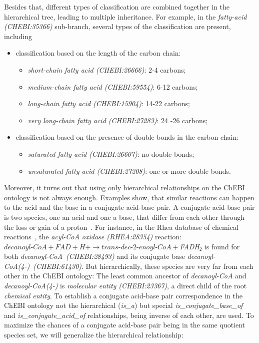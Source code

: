 \documentclass[10pt]{bmc_article}
\newenvironment{bmcformat}{\baselineskip20pt\sloppy\setboolean{publ}{false}}{\baselineskip20pt\sloppy}
\begin{document}
\begin{bmcformat}
Besides that, different types of classification are combined together in the hierarchical tree, leading to multiple inheritance. For example, in the \textit{fatty-acid (CHEBI:35366)} sub-branch, several types of the classification are present, including
\begin{itemize}
\item classification based on the length of the carbon chain:
\begin{itemize}
\item \textit{short-chain fatty acid (CHEBI:26666)}: 2-4 carbons;
\item \textit{medium-chain fatty acid (CHEBI:59554)}: 6-12 carbons;
\item \textit{long-chain fatty acid (CHEBI:15904)}: 14-22 carbons;
\item \textit{very long-chain fatty acid (CHEBI:27283)}: 24 -26 carbons;
\end{itemize}
\item classification based on the presence of double bonds in the carbon chain:
\begin{itemize}
\item \textit{saturated fatty acid (CHEBI:26607)}: no double bonds;
\item \textit{unsaturated fatty acid (CHEBI:27208)}: one or more double bonds.
\end{itemize}
\end{itemize}

Moreover, it turns out that using only hierarchical relationships on the ChEBI ontology is not always enough. Examples show, that similar reactions can happen to the acid and the base in a conjugate acid-base pair. A conjugate acid-base pair is two species, one an acid and one a base, that differ from each other through the loss or gain of a proton~\cite{stoker2012general}. For instance, in the Rhea database of chemical reactions~\cite{Alcantara2012}, the \textit{acyl-CoA oxidase (RHEA:28354)} reaction: $\textit{decanoyl-CoA} + \textit{FAD} + \textit{H+} \rightarrow \textit{trans-dec-2-enoyl-CoA} + $\textit{FADH$_2$} is found for both \textit{decanoyl-CoA~(CHEBI:28493)} and its conjugate base \textit{decanoyl-CoA(4-)~(CHEBI:61430)}. But hierarchically, these species are very far from each other in the ChEBI ontology: The least common ancestor of \textit{decanoyl-CoA} and \textit{decanoyl-CoA(4-)} is \textit{molecular entity (CHEBI:23367)}, a direct child of the root \textit{chemical entity}. To establish a conjugate acid-base pair correspondence in the ChEBI ontology not the hierarchical (\textit{is\_a}) but special \textit{is\_conjugate\_base\_of} and \textit{is\_conjugate\_acid\_of} relationships, being inverse of each other, are used. To maximize the chances of a conjugate acid-base pair being in the same quotient species set, we will generalize the hierarchical relationship:


\end{bmcformat}
\end{document}

